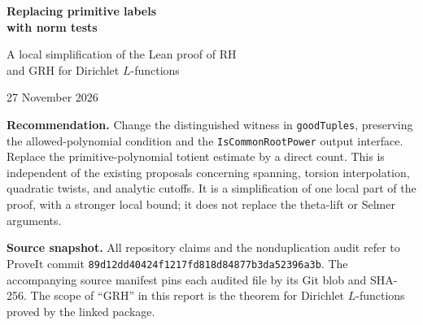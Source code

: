 \documentclass[11pt,a4paper]{article}
\newcommand{\src}[1]{\nolinkurl{#1}}
\newcommand{\commit}{\texttt{89d12dd40424f1217fd818d84877b3da52396a3b}}
\theoremstyle{definition}
\theoremstyle{remark}
\begin{document}
\begin{center}
{\color{ink}\sffamily\bfseries\LARGE Replacing primitive labels\\[3pt] with norm tests}\par
\vspace{8pt}
{\large A local simplification of the Lean proof of RH\\and GRH for Dirichlet $L$-functions}\par
\vspace{7pt}
{27 November 2026}\par
\end{center}

\begin{abstract}
The proof selects a distinguished finite-field polynomial whose root generates
the entire multiplicative group of an extension. The downstream arguments use
only a fraction of that information: irreducibility that survives every
prime-power map, invariance under certain scalar twists, and divisibility of
the order of a common root power. This report replaces the primitive-root
condition by explicit tests on the norm and one exclusion from a subgroup.
The replacement has an exact elementary count. For the parameters already
present in the source, at least $q^r/(4r)$ monic polynomials qualify, and the
bad-type estimate needs $f\ge4rL$ in place of
$f\ge2r(2r\log q+1)L$. Complete proofs, an audit of the consumers and prior
proposals, reproducible exact checks, and a formalization plan are supplied.
The local mathematical result is proved here; its integration into Lean has
not been implemented or compiled.
\end{abstract}

\begin{keybox}
\textbf{Recommendation.} Change the distinguished witness in
\src{goodTuples}, preserving the allowed-polynomial condition and the
\src{IsCommonRootPower} output interface. Replace the primitive-polynomial
totient estimate by a direct count. This is independent of the existing
proposals concerning spanning, torsion interpolation, quadratic twists, and
analytic cutoffs. It is a simplification of one local part of the proof,
with a stronger local bound; it does not replace the theta-lift or Selmer
arguments.
\end{keybox}

\textbf{Source snapshot.} All repository claims and the nonduplication audit
refer to ProveIt commit \commit. The accompanying source manifest pins each
audited file by its Git blob and SHA-256. The scope of ``GRH'' in this report
is the theorem for Dirichlet $L$-functions proved by the linked package.
\end{document}
